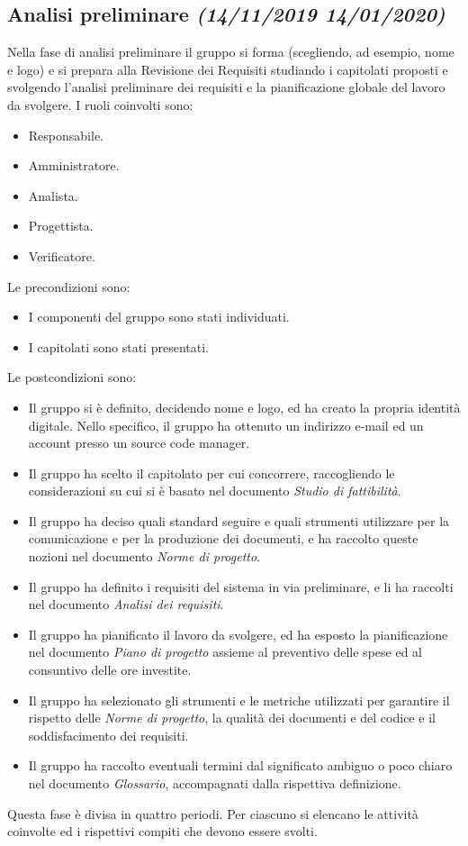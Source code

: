 \documentclass[../piano-di-progetto.tex]{subfiles}
\begin{document}
\subsection[Analisi preliminare]{Analisi preliminare {\normalsize\normalfont\itshape(14/11/2019  14/01/2020)}}%
\label{sub:analisi_preliminare}
Nella fase di analisi preliminare il gruppo si forma (scegliendo, ad esempio, nome e logo) e si prepara alla Revisione dei Requisiti studiando i capitolati proposti e svolgendo l'analisi preliminare dei requisiti e la pianificazione globale del lavoro da svolgere.
I ruoli coinvolti sono:
\begin{itemize}
  \item Responsabile.
  \item Amministratore.
  \item Analista.
  \item Progettista.
  \item Verificatore.
\end{itemize}
Le precondizioni sono:
\begin{itemize}
  \item I componenti del gruppo sono stati individuati.
  \item I capitolati sono stati presentati.
\end{itemize}
Le postcondizioni sono:
\begin{itemize}
  \item Il gruppo si è definito, decidendo nome e logo, ed ha creato la propria identità digitale. Nello specifico, il gruppo ha ottenuto un indirizzo e-mail ed un account presso un source code manager.
  \item Il gruppo ha scelto il capitolato per cui concorrere, raccogliendo le considerazioni su cui si è basato nel documento \textit{Studio di fattibilità}.
  \item Il gruppo ha deciso quali standard seguire e quali strumenti utilizzare per la comunicazione e per la produzione dei documenti, e ha raccolto queste nozioni nel documento \textit{Norme di progetto}.
  \item Il gruppo ha definito i requisiti del sistema in via preliminare, e li ha raccolti nel documento \textit{Analisi dei requisiti}.
  \item Il gruppo ha pianificato il lavoro da svolgere, ed ha esposto la pianificazione nel documento \textit{Piano di progetto} assieme al preventivo delle spese ed al consuntivo delle ore investite.
  \item Il gruppo ha selezionato gli strumenti e le metriche utilizzati per garantire il rispetto delle \textit{Norme di progetto}, la qualità dei documenti e del codice e il soddisfacimento dei requisiti.
  \item Il gruppo ha raccolto eventuali termini dal significato ambiguo o poco chiaro nel documento \textit{Glossario}, accompagnati dalla rispettiva definizione.
\end{itemize}
Questa fase è divisa in quattro periodi.
Per ciascuno si elencano le attività coinvolte ed i rispettivi compiti che devono essere svolti.
\end{document}
